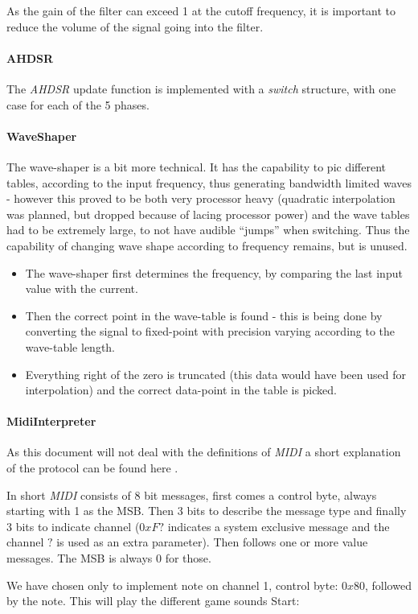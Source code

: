 As the gain of the filter can exceed 1 at the cutoff frequency, it is important
to reduce the volume of the signal going into the filter.

\paragraph{AHDSR}
The \emph{AHDSR} update function is implemented with a \emph{switch}
structure, with one case for each of the 5 phases.

\paragraph{WaveShaper}
The wave-shaper is a bit more technical.
It has the capability to pic different tables, according to the input
frequency, thus generating bandwidth limited waves - however this proved to be
both very processor heavy (quadratic interpolation was planned, but dropped
because of lacing processor power) and the wave tables had to be extremely
large, to not have audible ``jumps'' when switching.
Thus the capability of changing wave shape according to frequency remains, but is
unused.

\begin{itemize}
  \item The wave-shaper first determines the frequency, by comparing the last
  input value with the current.
  \item Then the correct point in the wave-table is found - this is being done
  by converting the signal to fixed-point with precision varying according to
  the wave-table length.
  \item Everything right of the zero is truncated (this data
  would have been used for interpolation) and the correct data-point in the
  table is picked.
\end{itemize}

\paragraph{MidiInterpreter}
As this document will not deal with the definitions of \emph{MIDI} a short
explanation of the protocol can be found here \cite{MIDI}.

In short \emph{MIDI} consists of 8 bit messages, first comes a control byte,
always starting with 1 as the MSB. Then 3 bits to describe the message type and
finally 3 bits to indicate channel ($0xF?$ indicates a system exclusive message
and the channel $?$ is used as an extra parameter). Then follows one or more
value messages. The MSB is always 0 for those.

We have chosen only to implement note on channel 1, control byte: $0x80$,
followed by the note. This will play the different game sounds
Start:
